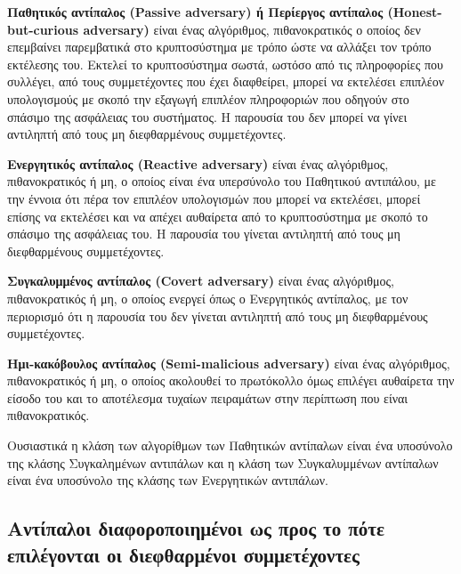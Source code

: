 \begin{definition}
\textbf{Παθητικός αντίπαλος (Passive adversary) ή Περίεργος αντίπαλος (Honest-but-curious adversary)} είναι ένας αλγόριθμος, πιθανοκρατικός ο οποίος δεν επεμβαίνει παρεμβατικά στο κρυπτοσύστημα με τρόπο ώστε να αλλάξει τον τρόπο εκτέλεσης του. Εκτελεί το κρυπτοσύστημα σωστά, ωστόσο από τις πληροφορίες που συλλέγει, από τους συμμετέχοντες που έχει διαφθείρει, μπορεί να εκτελέσει επιπλέον υπολογισμούς με σκοπό την εξαγωγή επιπλέον πληροφοριών που οδηγούν στο σπάσιμο της ασφάλειας του συστήματος. Η παρουσία του δεν μπορεί να γίνει αντιληπτή από τους μη διεφθαρμένους συμμετέχοντες.
\end{definition}

\begin{definition}
\textbf{Ενεργητικός αντίπαλος (Reactive adversary)} είναι ένας αλγόριθμος, πιθανοκρατικός ή μη, ο οποίος είναι ένα υπερσύνολο του Παθητικού αντιπάλου, με την έννοια ότι πέρα τον επιπλέον υπολογισμών που μπορεί να εκτελέσει, μπορεί επίσης να εκτελέσει και να απέχει αυθαίρετα από το κρυπτοσύστημα με σκοπό το σπάσιμο της ασφάλειας του. Η παρουσία του γίνεται αντιληπτή από τους μη διεφθαρμένους συμμετέχοντες.
\end{definition}

\begin{definition}
\textbf{Συγκαλυμμένος αντίπαλος (Covert adversary)} είναι ένας αλγόριθμος, πιθανοκρατικός ή μη, ο οποίος ενεργεί όπως ο Ενεργητικός αντίπαλος, με τον περιορισμό ότι η παρουσία του δεν γίνεται αντιληπτή από τους μη διεφθαρμένους συμμετέχοντες.
\end{definition}

\begin{definition}
\textbf{Ημι-κακόβουλος αντίπαλος (Semi-malicious adversary)} είναι ένας αλγόριθμος, πιθανοκρατικός ή μη, ο οποίος ακολουθεί το πρωτόκολλο όμως επιλέγει αυθαίρετα την είσοδο του και το αποτέλεσμα τυχαίων πειραμάτων στην περίπτωση που είναι πιθανοκρατικός.
\end{definition}

Ουσιαστικά η κλάση των αλγορίθμων των Παθητικών αντίπαλων είναι ένα υποσύνολο της κλάσης Συγκαλημένων αντιπάλων και η κλάση των Συγκαλυμμένων αντίπαλων είναι ένα υποσύνολο της κλάσης των Ενεργητικών αντιπάλων.

\subsection{Αντίπαλοι διαφοροποιημένοι ως προς το πότε επιλέγονται οι διεφθαρμένοι συμμετέχοντες}

